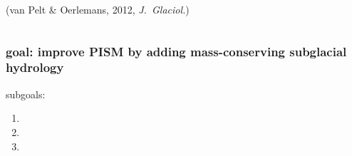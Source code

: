 \documentclass[hide notes,intlimits]{beamer}
\begin{document}
\begin{frame}
\begin{columns}
\begin{column}{0.5\textwidth}
\begin{center}
\medskip
\scriptsize (van Pelt \& Oerlemans, 2012, \emph{J.~Glaciol.})
\end{center}
\end{column}
\end{columns}
\end{frame}


\begin{frame}
  \frametitle{goal: improve PISM by adding mass-conserving subglacial hydrology}

subgoals:

\begin{enumerate}
  \item {}
  \item {}
  \item {}
\end{enumerate}

\end{frame}
\end{document}
